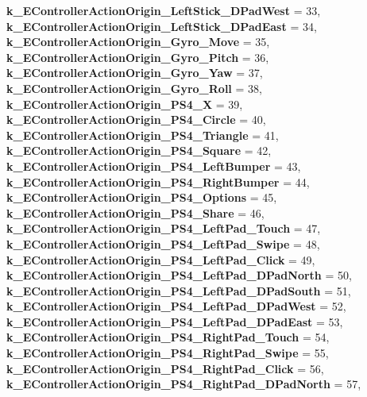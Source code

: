 \begin{DoxyCompactItemize}
{\bfseries k\+\_\+\+E\+Controller\+Action\+Origin\+\_\+\+Left\+Stick\+\_\+\+D\+Pad\+West} = 33, 
{\bfseries k\+\_\+\+E\+Controller\+Action\+Origin\+\_\+\+Left\+Stick\+\_\+\+D\+Pad\+East} = 34, 
{\bfseries k\+\_\+\+E\+Controller\+Action\+Origin\+\_\+\+Gyro\+\_\+\+Move} = 35, 
\newline
{\bfseries k\+\_\+\+E\+Controller\+Action\+Origin\+\_\+\+Gyro\+\_\+\+Pitch} = 36, 
{\bfseries k\+\_\+\+E\+Controller\+Action\+Origin\+\_\+\+Gyro\+\_\+\+Yaw} = 37, 
{\bfseries k\+\_\+\+E\+Controller\+Action\+Origin\+\_\+\+Gyro\+\_\+\+Roll} = 38, 
{\bfseries k\+\_\+\+E\+Controller\+Action\+Origin\+\_\+\+P\+S4\+\_\+X} = 39, 
\newline
{\bfseries k\+\_\+\+E\+Controller\+Action\+Origin\+\_\+\+P\+S4\+\_\+\+Circle} = 40, 
{\bfseries k\+\_\+\+E\+Controller\+Action\+Origin\+\_\+\+P\+S4\+\_\+\+Triangle} = 41, 
{\bfseries k\+\_\+\+E\+Controller\+Action\+Origin\+\_\+\+P\+S4\+\_\+\+Square} = 42, 
{\bfseries k\+\_\+\+E\+Controller\+Action\+Origin\+\_\+\+P\+S4\+\_\+\+Left\+Bumper} = 43, 
\newline
{\bfseries k\+\_\+\+E\+Controller\+Action\+Origin\+\_\+\+P\+S4\+\_\+\+Right\+Bumper} = 44, 
{\bfseries k\+\_\+\+E\+Controller\+Action\+Origin\+\_\+\+P\+S4\+\_\+\+Options} = 45, 
{\bfseries k\+\_\+\+E\+Controller\+Action\+Origin\+\_\+\+P\+S4\+\_\+\+Share} = 46, 
{\bfseries k\+\_\+\+E\+Controller\+Action\+Origin\+\_\+\+P\+S4\+\_\+\+Left\+Pad\+\_\+\+Touch} = 47, 
\newline
{\bfseries k\+\_\+\+E\+Controller\+Action\+Origin\+\_\+\+P\+S4\+\_\+\+Left\+Pad\+\_\+\+Swipe} = 48, 
{\bfseries k\+\_\+\+E\+Controller\+Action\+Origin\+\_\+\+P\+S4\+\_\+\+Left\+Pad\+\_\+\+Click} = 49, 
{\bfseries k\+\_\+\+E\+Controller\+Action\+Origin\+\_\+\+P\+S4\+\_\+\+Left\+Pad\+\_\+\+D\+Pad\+North} = 50, 
{\bfseries k\+\_\+\+E\+Controller\+Action\+Origin\+\_\+\+P\+S4\+\_\+\+Left\+Pad\+\_\+\+D\+Pad\+South} = 51, 
\newline
{\bfseries k\+\_\+\+E\+Controller\+Action\+Origin\+\_\+\+P\+S4\+\_\+\+Left\+Pad\+\_\+\+D\+Pad\+West} = 52, 
{\bfseries k\+\_\+\+E\+Controller\+Action\+Origin\+\_\+\+P\+S4\+\_\+\+Left\+Pad\+\_\+\+D\+Pad\+East} = 53, 
{\bfseries k\+\_\+\+E\+Controller\+Action\+Origin\+\_\+\+P\+S4\+\_\+\+Right\+Pad\+\_\+\+Touch} = 54, 
{\bfseries k\+\_\+\+E\+Controller\+Action\+Origin\+\_\+\+P\+S4\+\_\+\+Right\+Pad\+\_\+\+Swipe} = 55, 
\newline
{\bfseries k\+\_\+\+E\+Controller\+Action\+Origin\+\_\+\+P\+S4\+\_\+\+Right\+Pad\+\_\+\+Click} = 56, 
{\bfseries k\+\_\+\+E\+Controller\+Action\+Origin\+\_\+\+P\+S4\+\_\+\+Right\+Pad\+\_\+\+D\+Pad\+North} = 57, 

\end{DoxyCompactItemize}
